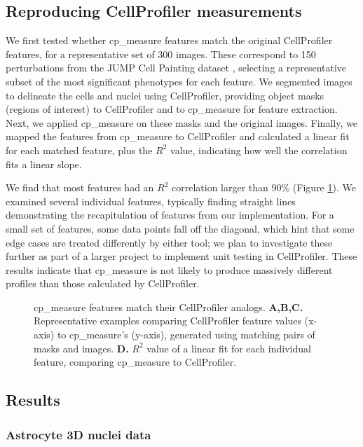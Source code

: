 \documentclass{article}
\begin{document}
\subsection{Reproducing CellProfiler measurements}
\label{sec:org09b0cd2}
We first tested whether cp\_measure features match the original CellProfiler features, for a representative set of 300 images. These correspond to 150 perturbations from the JUMP Cell Painting dataset \citep{chandrasekaranJUMPCellPainting2023}, selecting a representative subset of the most significant phenotypes for each feature. We segmented images to delineate the cells and nuclei using CellProfiler, providing object masks (regions of interest) to CellProfiler and to cp\_measure for feature extraction. Next, we applied cp\_measure on these masks and the original images. Finally, we mapped the features from cp\_measure to CellProfiler and calculated a linear fit for each matched feature, plus the \(R^2\) value, indicating how well the correlation fits a linear slope.

We find that most features had an $R^2$ correlation larger than 90\% (Figure \ref{fig:cp_vs_cpmeasure}). We examined several individual features, typically finding straight lines demonstrating the recapitulation of features from our implementation. For a small set of features, some data points fall off the diagonal, which hint that some edge cases are treated differently by either tool; we plan to investigate these further as part of a larger project to implement unit testing in CellProfiler. These results indicate that cp\_measure is not likely to produce massively different profiles than those calculated by CellProfiler.

\begin{figure}[htbp]
\centering

\caption{\label{fig:cp_vs_cpmeasure}cp\_measure features match their CellProfiler analogs. \textbf{A,B,C.} Representative examples comparing CellProfiler feature values (x-axis) to cp\_measure's (y-axis), generated using matching pairs of masks and images. \textbf{D.} \(R^2\) value of a linear fit for each individual feature, comparing cp\_measure to CellProfiler.}
\end{figure}

\subsection{Results}
\label{sec:orge5b5c6b}
\subsubsection{Astrocyte 3D nuclei data}
\label{sec:org447090b}
\end{document}
